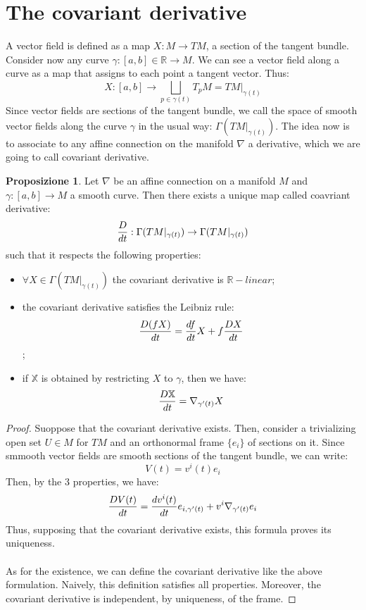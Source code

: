 \documentclass[12pt,a4paper]{report}
\theoremstyle{definition}
\theoremstyle{Theorem}
\newtheorem{Prop}[Def]{Proposizione}
\theoremstyle{definition}
\theoremstyle{definition}
\theoremstyle{definition}
\begin{document}
	\section{The covariant derivative}
	A vector field is defined as a map $X:M\rightarrow TM$, a section of the tangent bundle. Consider now any curve $\gamma:[a,b]\in\mathbb{R}\rightarrow M$. We can see a vector field along a curve as a map that assigns to each point a tangent vector. Thus:
	$$X:[a,b]\rightarrow \bigsqcup_{p\in \gamma(t)} T_pM=TM|_{\gamma(t)}$$
	Since vector fields are sections of the tangent bundle, we call the space of smooth vector fields along the curve $\gamma$ in the usual way: $\Gamma(TM|_{\gamma(t)})$.
	The idea now is to associate to any affine connection on the manifold $\nabla$ a derivative, which we are going to call covariant derivative.
	\begin{Prop}
		Let $\nabla$ be an affine connection on a manifold $M$ and $\gamma:[a,b]\rightarrow M$ a smooth curve. Then there exists a unique map called coavriant derivative:
		$${D\over dt}:\Gamma(TM|_{\gamma(t)})\rightarrow\Gamma(TM|_{\gamma(t)})$$
		such that it respects the following properties:
		\begin{itemize}
			\item $\forall X\in \Gamma(TM|_{\gamma(t)})$ the covariant derivative is $\mathbb{R}-linear$;
			\item the covariant derivative satisfies the Leibniz rule:
			$${D(fX)\over dt}={df\over dt}X+f{DX\over dt}$$;
			\item if $\mathbb{X}$ is obtained by restricting $X$ to $\gamma$, then we have:
			$${D\mathbb{X}\over dt}=\nabla_{\gamma'(t)}X$$
		\end{itemize}
	\end{Prop}
	\begin{proof}
		Suoppose that the covariant derivative exists. Then, consider a trivializing open set $U\in M$ for $TM$ and an orthonormal frame $\{e_i\}$ of sections on it. Since smmooth vector fields are smooth sections of the tangent bundle, we can write:
		$$V(t)=v^i(t)e_i$$
		Then, by the 3 properties, we have:
		$${DV(t)\over dt}={dv^i(t)\over dt}e_{i,\gamma'(t)}+v^i\nabla_{\gamma'(t)}e_i$$
		Thus, supposing that the covariant derivative exists, this formula proves its uniqueness.\\
		\\
		As for the existence, we can define the covariant derivative like the above formulation. Naively, this definition satisfies all properties. Moreover, the covariant derivative is independent, by uniqueness, of the frame.
	\end{proof}
\end{document}
